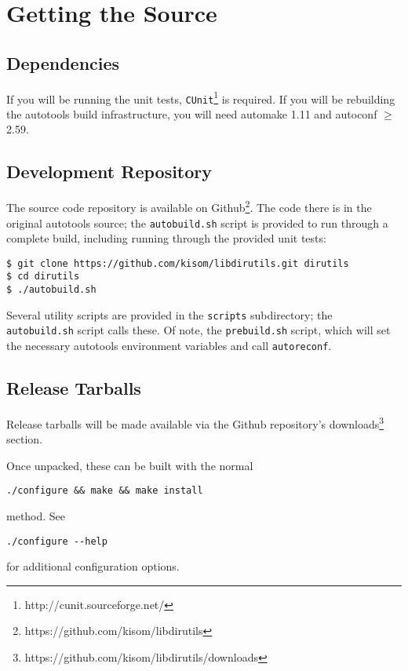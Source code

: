 \documentclass[10pt,letterpaper]{article}
\begin{document}
\section*{Getting the Source}
\subsection*{Dependencies}
If you will be running the unit tests, \verb|CUnit|\footnote{http://cunit.sourceforge.net/}
is required. If you will be rebuilding the autotools build infrastructure,
you will need automake 1.11 and autoconf $\geq$ 2.59.
\subsection*{Development Repository}
The source code repository is available on Github\footnote{https://github.com/kisom/libdirutils}.
The code there is in the original autotools source; the \verb|autobuild.sh|
script is provided to run through a complete build, including running through
the provided unit tests:

\begin{verbatim}
$ git clone https://github.com/kisom/libdirutils.git dirutils
$ cd dirutils
$ ./autobuild.sh
\end{verbatim}

Several utility scripts are provided in the \verb|scripts| subdirectory;
the \verb|autobuild.sh| script calls these. Of note, the \verb|prebuild.sh|
script, which will set the necessary autotools environment variables and call
\verb|autoreconf|.
\subsection*{Release Tarballs}
Release tarballs will be made available via the Github repository's
downloads\footnote{https://github.com/kisom/libdirutils/downloads} section.

Once unpacked, these can be built with the normal

\begin{verbatim}
./configure && make && make install
\end{verbatim}

method. See

\begin{verbatim}
./configure --help
\end{verbatim}

for additional configuration options.
\end{document}
